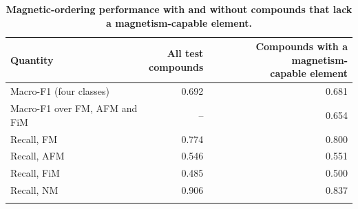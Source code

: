 \documentclass[pdflatex,sn-nature]{sn-jnl}
\makeatletter
\newcommand{\hd}[1]{\begin{tabular}[b]{@{}c@{}}#1\end{tabular}}
\makeatother
\begin{document}
\begin{table}[!ht]
\caption{\textbf{Magnetic-ordering performance with and without compounds that lack a magnetism-capable element.}}\label{tab:s7}%
\begin{tabular*}{\textwidth}{@{\extracolsep\fill}p{180pt}rr@{}}
\toprule
Quantity & \hd{All test\\compounds} & \hd{Compounds with a magnetism-\\capable element} \\
\midrule
Macro-F1 (four classes) & 0.692 & 0.681 \\
Macro-F1 over FM, AFM and FiM & -- & 0.654 \\
Recall, FM & 0.774 & 0.800 \\
Recall, AFM & 0.546 & 0.551 \\
Recall, FiM & 0.485 & 0.500 \\
Recall, NM & 0.906 & 0.837 \\
\botrule
\end{tabular*}
\end{table}
\end{document}
